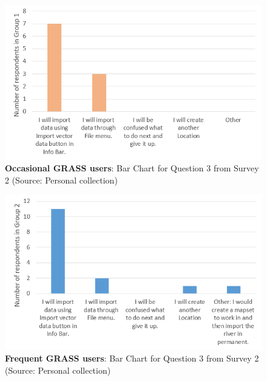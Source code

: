\documentclass[a4paper,10pt,twoside]{article}
\begin{document}
\newpage
\vspace{0.3cm}
\begin{figure}[hbt!] 
\begin{center}
\includegraphics[width=14cm]{../surveys/analyzed_data/survey2_question3_histogram_group1.png}
\caption[\textbf{Occasional GRASS users}: Bar Chart for Question 3 from Survey 2]{\textbf{Occasional GRASS users}: Bar Chart for Question 3 from Survey 2 (Source: Personal collection)}
\label{fig:survey2_question3_histogram_group1}
\end{center}
\end{figure}

\vspace{0.3cm}
\begin{figure}[hbt!]
\begin{center}
\includegraphics[width=14cm]{../surveys/analyzed_data/survey2_question3_histogram_group2.png} 
\caption[\textbf{Frequent GRASS users}: Bar Chart for Question 3 from Survey 2]{\textbf{Frequent GRASS users}: Bar Chart for Question 3 from Survey 2 (Source: Personal collection)}
\label{fig:survey2_question3_histogram_group2}
\end{center}
\end{figure}
\end{document}
